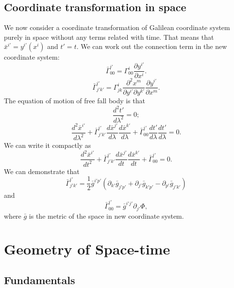 \section{Coordinate transformation in space}
\noindent
We now consider a coordinate transformation of Galilean coordinate system purely in space without any terms related with time. That means that $\bar{x}^{i'} = y^{i'}(x^{i})$ and $t'=t$. We can work out the connection term in the new coordinate system:
\[\bar{\Gamma}^{i'}_{00} = \Gamma^{i}_{00} \frac{\partial y^{i'}}{\partial x^{i}}.\]
\[\bar{\Gamma}^{i'}_{j'k'} = \Gamma^{i}_{jk} \frac{\partial^2 x^{m}}{\partial y^{i'}\partial y^{k'}} \frac{\partial y^{i'}}{\partial x^{m}}.\]
The equation of motion of free fall body is that
\[\frac{d^2 t'}{d\lambda^2} = 0;\]
\[\frac{d^2 \bar{x}^{i'}}{d\lambda^2} + \bar{\Gamma}^{i'}_{j' k'} \frac{d\bar{x}^{j'}}{d \lambda} \frac{d\bar{x}^{k'}}{d \lambda} + \bar{\Gamma}^{i'}_{0 0} \frac{dt'}{d \lambda} \frac{dt'}{d \lambda}=0.\]
We can write it compactly as 
\[\frac{d^2 \bar{x}^{i'}}{dt^2} + \bar{\Gamma}^{i'}_{j' k'} \frac{d\bar{x}^{j'}}{dt} \frac{d\bar{x}^{k'}}{dt} + \bar{\Gamma}^{i'}_{0 0}=0.\]
We can demonstrate that
\[\bar{\Gamma}^{i'}_{j'k'} = \frac{1}{2} \bar{g}^{i'p'}(\partial_{k'}\bar{g}_{j'p'}+ \partial_{j'}\bar{g}_{k'p'}-\partial_{p'}\bar{g}_{j'k'}) \]
and
\[\bar{\Gamma}^{i'}_{00} = \bar{g}^{i'j'}\partial_{j'}\Phi, \]
where $\bar{g}$ is the metric of the space in new coordinate system.

\chapter{Geometry of Space-time}
\section{Fundamentals}
